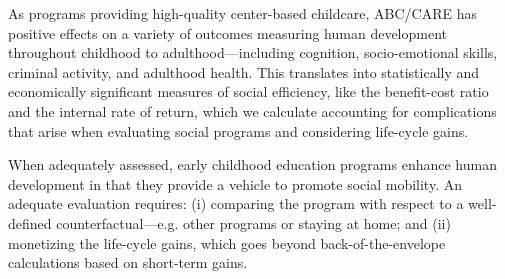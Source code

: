 As programs providing high-quality center-based childcare, ABC/CARE has positive effects on a variety of outcomes measuring human development throughout childhood to adulthood---including cognition, socio-emotional skills, criminal activity, and adulthood health. This translates into statistically and economically significant measures of social efficiency, like the benefit-cost ratio and the internal rate of return, which we calculate accounting for complications that arise when evaluating social programs and considering life-cycle gains.

When adequately assessed, early childhood education programs enhance human development in that they provide a vehicle to promote social mobility. An adequate evaluation requires: (i) comparing the program with respect to a well-defined counterfactual---e.g. other programs or staying at home; and (ii) monetizing the life-cycle gains, which goes beyond back-of-the-envelope calculations based on short-term gains.

\clearpage

\singlespace



 